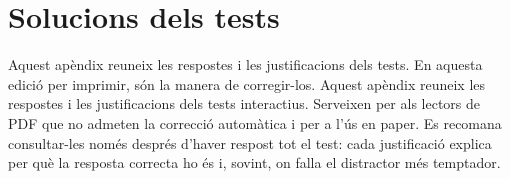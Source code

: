 \chapter{Solucions dels tests}
\label{cap:solucions-tests}

\ifimprimible
Aquest apèndix reuneix les respostes i les justificacions dels tests. En aquesta edició per imprimir, són la manera de corregir-los.
\else
Aquest apèndix reuneix les respostes i les justificacions dels tests interactius. Serveixen per als lectors de PDF que no admeten la correcció automàtica i per a l'ús en paper.
\fi Es recomana consultar-les només després d'haver respost tot el test: cada justificació explica per què la resposta correcta ho és i, sovint, on falla el distractor més temptador.

\imprimeixsolucionstests

